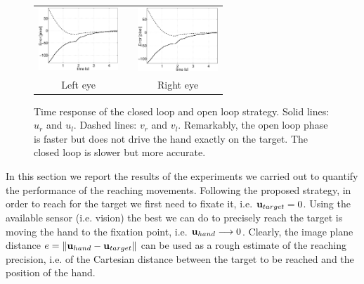   \begin{figure}
  \begin{center}
	\begin{tabular}{ccc}
	  \parbox{30mm}{\includegraphics[width=30mm]{Figure/LeftEyeOpenClosedLoopTimeResponse.eps}}  & \hspace{.1cm} &
	  \parbox{30mm}{\includegraphics[width=30mm]{Figure/RightEyeOpenClosedLoopTimeResponse.eps}}
	  \\
	  \parbox{30mm}{\centering Left eye } & \hspace{.1cm} & \parbox{50mm}{\centering Right eye }
  \end{tabular}
\end{center}
\caption{Time response of the closed loop and open loop strategy. Solid lines: $u_r$ and $u_l$. Dashed lines: $v_r$ and $v_l$. Remarkably, the open loop phase is faster but does not drive the hand exactly on the target. The closed loop is slower but more accurate.}\label{Fig:TimeResponseOpenClosedLoop}
\end{figure}


In this section we report the results of the experiments we carried out
to quantify the performance of the reaching movements. Following the proposed 
strategy, in order to reach for the 
target we first need to fixate it, i.e. $\mathbf{u}_{target} = 0$. Using the available 
sensor (i.e. vision) the best we can do to precisely reach the target is 
moving the hand to the fixation point, i.e. 
${\mathbf{u}_{hand}} \longrightarrow 0$. Clearly, the image plane distance 
$e=\| \mathbf{u}_{hand} - \mathbf{u}_{target} \|$ can be used as a rough estimate of the reaching 
precision, i.e. of the Cartesian distance between the target to be reached 
and the position of the hand. %
%

